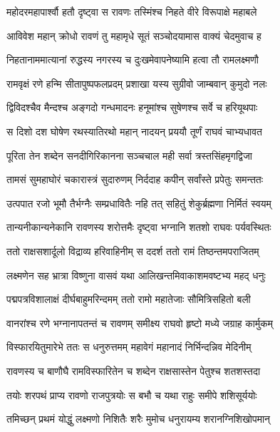 
\twolineshloka
{महोदरमहापार्श्वौ हतौ दृष्ट्वा स रावणः}
{तस्मिंश्च निहते वीरे विरूपाक्षे महाबले} %

\twolineshloka
{आविवेश महान् क्रोधो रावणं तु महामृधे}
{सूतं सञ्चोदयामास वाक्यं चेदमुवाच ह} %

\twolineshloka
{निहतानाममात्यानां रुद्धस्य नगरस्य च}
{दुःखमेवापनेष्यामि हत्वा तौ रामलक्ष्मणौ} %

\twolineshloka
{रामवृक्षं रणे हन्मि सीतापुष्पफलप्रदम्}
{प्रशाखा यस्य सुग्रीवो जाम्बवान् कुमुदो नलः} %

\twolineshloka
{द्विविदश्चैव मैन्दश्च अङ्गदो गन्धमादनः}
{हनूमांश्च सुषेणश्च सर्वे च हरियूथपाः} %

\twolineshloka
{स दिशो दश घोषेण रथस्यातिरथो महान्}
{नादयन् प्रययौ तूर्णं राघवं चाभ्यधावत} %

\twolineshloka
{पूरिता तेन शब्देन सनदीगिरिकानना}
{सञ्चचाल मही सर्वा त्रस्तसिंहमृगद्विजा} %

\twolineshloka
{तामसं सुमहाघोरं चकारास्त्रं सुदारुणम्}
{निर्ददाह कपीन् सर्वांस्ते प्रपेतुः समन्ततः} %

\twolineshloka
{उत्पपात रजो भूमौ तैर्भग्नैः सम्प्रधावितैः}
{नहि तत् सहितुं शेकुर्ब्रह्मणा निर्मितं स्वयम्} %

\twolineshloka
{तान्यनीकान्यनेकानि रावणस्य शरोत्तमैः}
{दृष्ट्वा भग्नानि शतशो राघवः पर्यवस्थितः} %

\twolineshloka
{ततो राक्षसशार्दूलो विद्राव्य हरिवाहिनीम्}
{स ददर्श ततो रामं तिष्ठन्तमपराजितम्} %

\twolineshloka
{लक्ष्मणेन सह भ्रात्रा विष्णुना वासवं यथा}
{आलिखन्तमिवाकाशमवष्टभ्य महद् धनुः} %

\twolineshloka
{पद्मपत्रविशालाक्षं दीर्घबाहुमरिन्दमम्}
{ततो रामो महातेजाः सौमित्रिसहितो बली} %

\twolineshloka
{वानरांश्च रणे भग्नानापतन्तं च रावणम्}
{समीक्ष्य राघवो हृष्टो मध्ये जग्राह कार्मुकम्} %

\twolineshloka
{विस्फारयितुमारेभे ततः स धनुरुत्तमम्}
{महावेगं महानादं निर्भिन्दन्निव मेदिनीम्} %

\twolineshloka
{रावणस्य च बाणौघै रामविस्फारितेन च}
{शब्देन राक्षसास्तेन पेतुश्च शतशस्तदा} %

\twolineshloka
{तयोः शरपथं प्राप्य रावणो राजपुत्रयोः}
{स बभौ च यथा राहुः समीपे शशिसूर्ययोः} %

\twolineshloka
{तमिच्छन् प्रथमं योद्धुं लक्ष्मणो निशितैः शरैः}
{मुमोच धनुरायम्य शरानग्निशिखोपमान्} %


